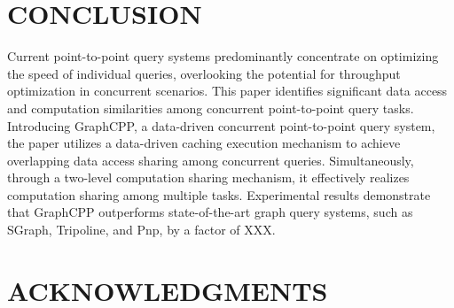 \documentclass[lettersize,journal]{IEEEtran} %
\begin{document}
\section{CONCLUSION}
Current point-to-point query systems predominantly concentrate on optimizing the speed of individual queries, overlooking the potential for throughput optimization in concurrent scenarios. This paper identifies significant data access and computation similarities among concurrent point-to-point query tasks. Introducing GraphCPP, a data-driven concurrent point-to-point query system, the paper utilizes a data-driven caching execution mechanism to achieve overlapping data access sharing among concurrent queries. Simultaneously, through a two-level computation sharing mechanism, it effectively realizes computation sharing among multiple tasks. Experimental results demonstrate that GraphCPP outperforms state-of-the-art graph query systems, such as SGraph\cite{sgraph}, Tripoline\cite{tripoline}, and Pnp\cite{pnp}, by a factor of XXX.

\section{ACKNOWLEDGMENTS}
\end{document}
